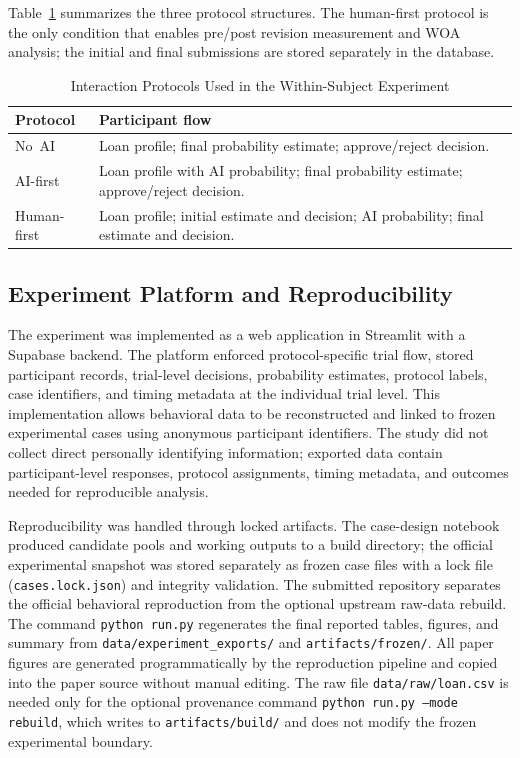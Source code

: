 \documentclass[conference]{IEEEtran}
\begin{document}
Table~\ref{tab:protocols} summarizes the three protocol structures.
The human-first protocol is the only condition that enables pre/post
revision measurement and WOA analysis; the initial and final submissions
are stored separately in the database.

\begin{table}[H]
  \centering
  \caption{Interaction Protocols Used in the Within-Subject Experiment}
  \label{tab:protocols}
  \small
  \begin{tabular}{>{\raggedright\arraybackslash}p{}
                  >{\raggedright\arraybackslash}p{}}
    \toprule
    \textbf{Protocol} & \textbf{Participant flow} \\
    \midrule
    No~AI & Loan profile; final probability estimate; approve/reject decision. \\
    AI-first & Loan profile with AI probability; final probability estimate; approve/reject decision. \\
    Human-first & Loan profile; initial estimate and decision; AI probability; final estimate and decision. \\
    \bottomrule
  \end{tabular}
\end{table}

\subsection{Experiment Platform and Reproducibility}

The experiment was implemented as a web application in Streamlit with a
Supabase backend. The platform enforced protocol-specific trial flow,
stored participant records, trial-level decisions, probability estimates,
protocol labels, case identifiers, and timing metadata at the individual
trial level. This implementation allows behavioral data to be reconstructed and linked to frozen experimental cases using anonymous participant identifiers. The study did not collect direct personally identifying information; exported
data contain participant-level responses, protocol assignments, timing
metadata, and outcomes needed for reproducible analysis.

Reproducibility was handled through locked artifacts. The case-design
notebook produced candidate pools and working outputs to a build
directory; the official experimental snapshot was stored separately as
frozen case files with a lock file (\texttt{cases.lock.json}) and
integrity validation. The submitted repository separates the official
behavioral reproduction from the optional upstream raw-data rebuild. The command \texttt{python run.py} regenerates the final reported tables, figures, and summary from
\texttt{data/experiment\_exports/} and \texttt{artifacts/frozen/}. All paper figures are generated programmatically by the reproduction
pipeline and copied into the paper source without manual editing. The raw file
\texttt{data/raw/loan.csv} is needed only for the optional provenance
command \texttt{python run.py --mode rebuild}, which writes to
\texttt{artifacts/build/} and does not modify the frozen experimental
boundary.
\end{document}
